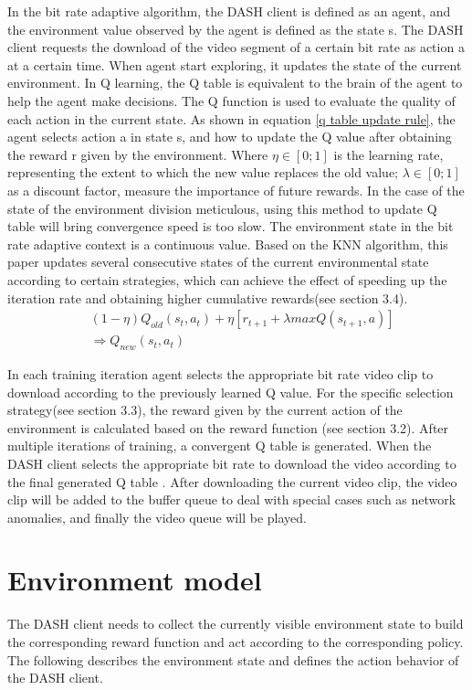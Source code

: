 \documentclass[twocolumn]{article}
\begin{document}
In the bit rate adaptive algorithm, the DASH client is defined as an agent, 
and the environment value observed by the agent is defined as the state s. 
The DASH client requests the download of the video segment of a certain 
bit rate as action a at a certain time.
When agent start exploring, it updates the state of the current environment.
In Q learning, the Q table is equivalent to the brain of the agent to help the agent make decisions. 
The Q function is used to evaluate the quality of each action in the current state.
As shown in equation \ref{q table update rule}, the agent selects action a in state s,
and how to update the Q value after obtaining the reward r given by the environment.
Where $\eta\in\left[0;1\right]$ is the learning rate, representing the extent to which the new value replaces the old value;
 $\lambda\in\left[0;1\right]$as a discount factor, measure the importance of future rewards.
 In the case of the state of the environment division meticulous, 
 using this method to update Q table will bring convergence speed is too slow.
 The environment state in the bit rate adaptive context is a continuous value. 
 Based on the KNN algorithm, this paper updates several consecutive states of 
 the current environmental state according to certain strategies, 
 which can achieve the effect of speeding up the iteration rate and obtaining higher cumulative rewards(see section 3.4).
\begin{equation}
\label{q table update rule}
\begin{aligned}
&\left(1-\eta\right)Q_{old}\left(s_t,a_t\right)+\eta\left[r_{t+1}+\lambda max Q\left(s_{t+1},a\right)\right]\\    
&\Rightarrow Q_{new}\left(s_t,a_t\right)
\end{aligned}
\end{equation}

In each training iteration agent selects the appropriate bit rate video clip to download 
according to the previously learned Q value. For the specific selection strategy(see section 3.3),
the reward given by the current action of the environment is calculated based on the reward function (see section 3.2).
After multiple iterations of training, a convergent Q table is generated. 
When the DASH client selects the appropriate bit rate to download the video according to 
the final generated Q table . 
After downloading the current video clip, the video clip will be added to the buffer queue to deal with 
special cases such as network anomalies, and finally the video queue will be played.
\section{Environment model}
The DASH client needs to collect the currently visible environment state 
to build the corresponding reward function and act according to the 
corresponding policy. The following describes the environment state and defines the action behavior of the DASH client.
\end{document}
